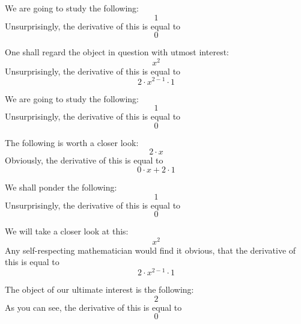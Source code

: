 \documentclass{article}
\begin{document}
We are going to study the following:
\begin{equation}
1 
\end{equation}
Unsurprisingly, the derivative of this is equal to
\begin{equation}
0 
\end{equation}

One shall regard the object in question with utmost interest:
\begin{equation}
x ^{2 } 
\end{equation}
Unsurprisingly, the derivative of this is equal to
\begin{equation}
2 \cdot x ^{2 - 1 } \cdot 1 
\end{equation}

We are going to study the following:
\begin{equation}
1 
\end{equation}
Unsurprisingly, the derivative of this is equal to
\begin{equation}
0 
\end{equation}

The following is worth a closer look:
\begin{equation}
2 \cdot x 
\end{equation}
Obviously, the derivative of this is equal to
\begin{equation}
0 \cdot x + 2 \cdot 1 
\end{equation}

We shall ponder the following:
\begin{equation}
1 
\end{equation}
Unsurprisingly, the derivative of this is equal to
\begin{equation}
0 
\end{equation}

We will take a closer look at this:
\begin{equation}
x ^{2 } 
\end{equation}
Any self-respecting mathematician would find it obvious, that the derivative of this is equal to
\begin{equation}
2 \cdot x ^{2 - 1 } \cdot 1 
\end{equation}

The object of our ultimate interest is the following:
\begin{equation}
2 
\end{equation}
As you can see, the derivative of this is equal to
\begin{equation}
0 
\end{equation}
\end{document}
